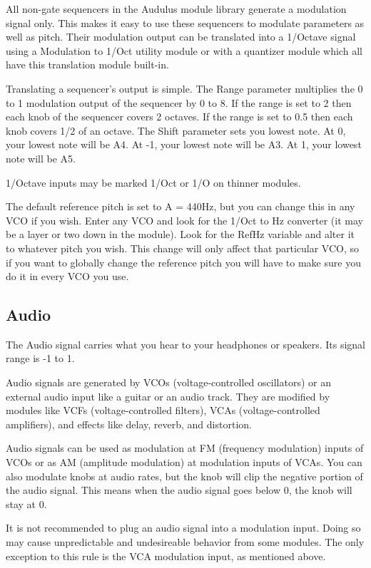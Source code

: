 \documentclass[11pt]{book}
\begin{document}
All non-gate sequencers in the Audulus module library generate a modulation signal only. This makes it easy to use these sequencers to modulate parameters as well as pitch. Their modulation output can be translated into a 1/Octave signal using a Modulation to 1/Oct utility module or with a quantizer module which all have this translation module built-in.

Translating a sequencer's output is simple. The Range parameter multiplies the 0 to 1 modulation output of the sequencer by 0 to 8. If the range is set to 2 then each knob of the sequencer covers 2 octaves. If the range is set to 0.5 then each knob covers 1/2 of an octave. The Shift parameter sets you lowest note. At 0, your lowest note will be A4. At -1, your lowest note will be A3. At 1, your lowest note will be A5.

1/Octave inputs may be marked 1/Oct or 1/O on thinner modules.

The default reference pitch is set to A = 440Hz, but you can change this in any VCO if you wish. Enter any VCO and look for the 1/Oct to Hz converter (it may be a layer or two down in the module). Look for the RefHz variable and alter it to whatever pitch you wish. This change will only affect that particular VCO, so if you want to globally change the reference pitch you will have to make sure you do it in every VCO you use.

\subsection{Audio}

The Audio signal carries what you hear to your headphones or speakers. Its signal range is -1 to 1.

Audio signals are generated by VCOs (voltage-controlled oscillators) or an external audio input like a guitar or an audio track. They are modified by modules like VCFs (voltage-controlled filters), VCAs (voltage-controlled amplifiers), and effects like delay, reverb, and distortion.

Audio signals can be used as modulation at FM (frequency modulation) inputs of VCOs or as AM (amplitude modulation) at modulation inputs of VCAs. You can also modulate knobs at audio rates, but the knob will clip the negative portion of the audio signal. This means when the audio signal goes below 0, the knob will stay at 0. 

It is not recommended to plug an audio signal into a modulation input. Doing so may cause unpredictable and undesireable behavior from some modules. The only exception to this rule is the VCA modulation input, as mentioned above.
\end{document}
